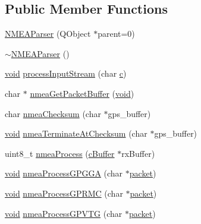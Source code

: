 \subsection*{Public Member Functions}
\begin{DoxyCompactItemize}
\item 
\hyperlink{group___g_p_s_gadget_plugin_gababc72322cf2d939a88939cc9036d884}{N\-M\-E\-A\-Parser} (Q\-Object $\ast$parent=0)
\item 
\hyperlink{group___g_p_s_gadget_plugin_gaedf659d241eff03757c31f3b80697f89}{$\sim$\-N\-M\-E\-A\-Parser} ()
\item 
\hyperlink{group___u_a_v_objects_plugin_ga444cf2ff3f0ecbe028adce838d373f5c}{void} \hyperlink{group___g_p_s_gadget_plugin_gaf4983b5649be1ec2deb7dafcd4a3573c}{process\-Input\-Stream} (char \hyperlink{glext_8h_a1f2d7f8147412c43ba2303a56f97ee73}{c})
\item 
char $\ast$ \hyperlink{group___g_p_s_gadget_plugin_ga5c79371e20badd15d23705c63eaacfe1}{nmea\-Get\-Packet\-Buffer} (\hyperlink{group___u_a_v_objects_plugin_ga444cf2ff3f0ecbe028adce838d373f5c}{void})
\item 
char \hyperlink{group___g_p_s_gadget_plugin_gaba9a601d8ec049e7f398b5d42cd974a1}{nmea\-Checksum} (char $\ast$gps\-\_\-buffer)
\item 
\hyperlink{group___u_a_v_objects_plugin_ga444cf2ff3f0ecbe028adce838d373f5c}{void} \hyperlink{group___g_p_s_gadget_plugin_gab0b239f615ef146897cec5c020735a8e}{nmea\-Terminate\-At\-Checksum} (char $\ast$gps\-\_\-buffer)
\item 
uint8\-\_\-t \hyperlink{group___g_p_s_gadget_plugin_ga55718bf48b8a95492b1aa43a65490e64}{nmea\-Process} (\hyperlink{group__buffer_ga63b2a19263ed371e329776b34f3164eb}{c\-Buffer} $\ast$rx\-Buffer)
\item 
\hyperlink{group___u_a_v_objects_plugin_ga444cf2ff3f0ecbe028adce838d373f5c}{void} \hyperlink{group___g_p_s_gadget_plugin_ga0ac80dbcc0ad8bec03f026c3feb2c097}{nmea\-Process\-G\-P\-G\-G\-A} (char $\ast$\hyperlink{group___antenna_track_gadget_plugin_gaa52c8cc41458c01d411d550d1e3f3d96}{packet})
\item 
\hyperlink{group___u_a_v_objects_plugin_ga444cf2ff3f0ecbe028adce838d373f5c}{void} \hyperlink{group___g_p_s_gadget_plugin_ga838f8b6c0bea66c17f82fec788a1a74f}{nmea\-Process\-G\-P\-R\-M\-C} (char $\ast$\hyperlink{group___antenna_track_gadget_plugin_gaa52c8cc41458c01d411d550d1e3f3d96}{packet})
\item 
\hyperlink{group___u_a_v_objects_plugin_ga444cf2ff3f0ecbe028adce838d373f5c}{void} \hyperlink{group___g_p_s_gadget_plugin_ga10893234aff922433723153e6057386e}{nmea\-Process\-G\-P\-V\-T\-G} (char $\ast$\hyperlink{group___antenna_track_gadget_plugin_gaa52c8cc41458c01d411d550d1e3f3d96}{packet})

\end{DoxyCompactItemize}
